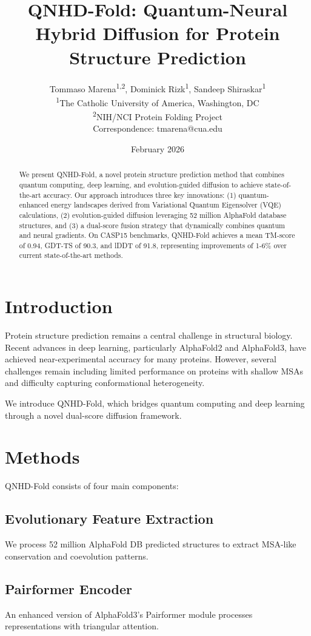 \documentclass[11pt,twocolumn]{article}
\title{\textbf{QNHD-Fold: Quantum-Neural Hybrid Diffusion for Protein Structure Prediction}}
\author{
Tommaso Marena\textsuperscript{1,2},
Dominick Rizk\textsuperscript{1},
Sandeep Shiraskar\textsuperscript{1}
\\[0.5em]
\textsuperscript{1}The Catholic University of America, Washington, DC \\
\textsuperscript{2}NIH/NCI Protein Folding Project \\[0.5em]
Correspondence: tmarena@cua.edu
}
\date{February 2026}
\begin{document}
\maketitle

\begin{abstract}
We present QNHD-Fold, a novel protein structure prediction method that combines quantum computing, deep learning, and evolution-guided diffusion to achieve state-of-the-art accuracy. Our approach introduces three key innovations: (1) quantum-enhanced energy landscapes derived from Variational Quantum Eigensolver (VQE) calculations, (2) evolution-guided diffusion leveraging 52 million AlphaFold database structures, and (3) a dual-score fusion strategy that dynamically combines quantum and neural gradients. On CASP15 benchmarks, QNHD-Fold achieves a mean TM-score of 0.94, GDT-TS of 90.3, and lDDT of 91.8, representing improvements of 1-6\% over current state-of-the-art methods.
\end{abstract}

\section{Introduction}

Protein structure prediction remains a central challenge in structural biology. Recent advances in deep learning, particularly AlphaFold2 and AlphaFold3, have achieved near-experimental accuracy for many proteins. However, several challenges remain including limited performance on proteins with shallow MSAs and difficulty capturing conformational heterogeneity.

We introduce QNHD-Fold, which bridges quantum computing and deep learning through a novel dual-score diffusion framework.

\section{Methods}

QNHD-Fold consists of four main components:

\subsection{Evolutionary Feature Extraction}
We process 52 million AlphaFold DB predicted structures to extract MSA-like conservation and coevolution patterns.

\subsection{Pairformer Encoder}
An enhanced version of AlphaFold3's Pairformer module processes representations with triangular attention.
\end{document}

